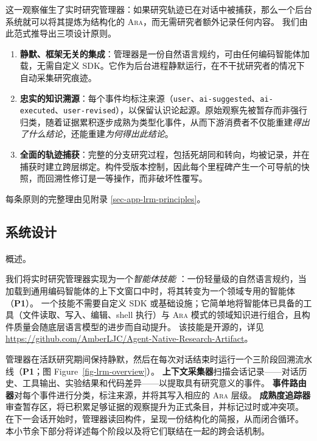 \documentclass[
]{article}
\makeatletter
\let\oldparagraph\paragraph
\renewcommand{\paragraph}{
    \@ifstar
      \xxxParagraphStar
      \xxxParagraphNoStar
  }
\newcommand{\xxxParagraphStar}[1]{\oldparagraph*{#1}\mbox{}}
\newcommand{\xxxParagraphNoStar}[1]{\oldparagraph{#1}\mbox{}}
\newcommand{\passthrough}[1]{#1}
\providecommand{\tightlist}{%
  \setlength{\itemsep}{0pt}\setlength{\parskip}{0pt}}
\theoremstyle{definition}
\newcommand{\ara}{\textsc{Ara}}
\makeatother
\begin{document}
这一观察催生了实时研究管理器：如果研究轨迹已在对话中被捕获，那么一个后台系统就可以将其提炼为结构化的
\ara{}，而无需研究者额外记录任何内容。 我们由此范式推导出三项设计原则。

\begin{enumerate}
\def\labelenumi{\arabic{enumi}.}
\tightlist
\item
  \textbf{静默、框架无关的集成}：管理器是一份自然语言规约，可由任何编码智能体加载，无需自定义
  SDK。它作为后台进程静默运行，在不干扰研究者的情况下自动采集研究痕迹。
\item
  \textbf{忠实的知识溯源}：每个事件均标注来源（\passthrough{\lstinline!user!}、\passthrough{\lstinline!ai-suggested!}、\passthrough{\lstinline!ai-executed!}、\passthrough{\lstinline!user-revised!}），以保留认识论起源。原始观察先被暂存而非强行归类，随着证据累积逐步成熟为类型化事件，从而下游消费者不仅能重建\emph{得出了什么结论}，还能重建\emph{为何得出此结论}。
\item
  \textbf{全面的轨迹捕获}：完整的分支研究过程，包括死胡同和转向，均被记录，并在捕获时建立跨层绑定。构件受版本控制，因此每个里程碑产生一个可导航的快照，而回溯性修订是一等操作，而非破坏性覆写。
\end{enumerate}

每条原则的完整理由见附录 \ref{sec-app-lrm-principles}。

\subsection{系统设计}\label{sec-lrm-design}

\paragraph{概述。}\label{ux6982ux8ff0}

我们将实时研究管理器实现为一个\emph{智能体技能}
\citep{agentskills2025}：一份轻量级的自然语言规约，当加载到通用编码智能体的上下文窗口中时，将其转变为一个领域专用的智能体（\textbf{P1}）。
一个技能不需要自定义 SDK
或基础设施；它简单地将智能体已具备的工具（文件读取、写入、编辑、shell
执行）与 \ara{}
模式的领域知识进行组合，且构件质量会随底层语言模型的进步而自动提升。
该技能是开源的，详见
\url{https://github.com/AmberLJC/Agent-Native-Research-Artifact}。

管理器在活跃研究期间保持静默，然后在每次对话结束时运行一个三阶段回溯流水线（\textbf{P1}；图
Figure~\ref{fig-lrm-overview}）。
\textbf{上下文采集器}扫描会话记录------对话历史、工具输出、实验结果和代码差异------以提取具有研究意义的事件。
\textbf{事件路由器}对每个事件进行分类，标注来源，并将其写入相应的 \ara{}
层级。
\textbf{成熟度追踪器}审查暂存区，将已积累足够证据的观察提升为正式条目，并标记过时或冲突项。
在下一会话开始时，管理器读回构件，呈现一份结构化的简报，从而闭合循环。
本小节余下部分将详述每个阶段以及将它们联结在一起的跨会话机制。
\end{document}
